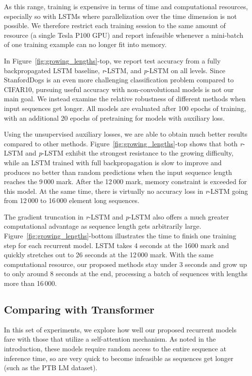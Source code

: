 \documentclass{article}
\newcommand{\rlstm}{{\it r}-LSTM}
\newcommand{\plstm}{{\it p}-LSTM}
\begin{document}
As this range, training is expensive in terms of time and computational resources, especially so with LSTMs where parallelization over the time dimension is not possible. We therefore restrict each training session to the same amount of resource (a single Tesla P100 GPU) and report infeasible whenever a mini-batch of one training example can no longer fit into memory.

In Figure~\ref{fig:growing_lengths}-top, we report test accuracy from a fully backpropagated LSTM baseline, \rlstm{}, and \plstm{} on all levels. Since StanfordDogs is an even more challenging classification problem compared to CIFAR10, pursuing useful accuracy with non-convolutional models is not our main goal. We instead examine the relative robustness of different methods when input sequences get longer. All models are evaluated after 100 epochs of training, with an additional 20 epochs of pretraining for models with auxiliary loss.

Using the unsupervised auxiliary losses, we are able to obtain much better results compared to other methods. Figure~\ref{fig:growing_lengths}-top shows that both \rlstm{} and \plstm{} exhibit the strongest resistance to the growing difficulty, while an LSTM trained with full backpropagation is slow to improve and produces no better than random predictions when the input sequence length reaches the 9\,000 mark. After the 12\,000 mark, memory constraint is exceeded for this model. At the same time, there is virtually no accuracy loss in \rlstm{} going from 12\,000 to 16\,000 element long sequences. 

The gradient truncation in \rlstm{} and \plstm{} also offers a much greater computational advantage as sequence length gets arbitrarily large. Figure~\ref{fig:growing_lengths}-bottom illustrates the time to finish one training step for each recurrent model. LSTM takes 4 seconds at the 1600 mark and quickly stretches out to 26 seconds at the 12\,000 mark. With the same computational resource, our proposed methods stay under 3 seconds and grow up to only around 8 seconds at the end, processing a batch of sequences with lengths more than 16\,000.

\subsection{Comparing with Transformer} 
\label{sec:transformer}

In this set of experiments, we explore how well our proposed recurrent models fare with those that utilize a self-attention mechanism. As noted in the introduction, these models require random access to the entire sequence at inference time, so are very quick to become infeasible as sequences get longer (such as the PTB LM dataset).
\end{document}
